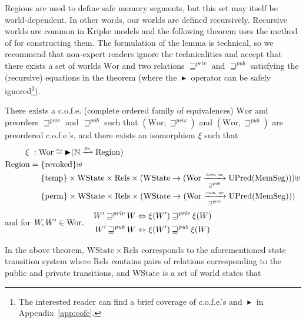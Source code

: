\documentclass[format=acmsmall, review=true, screen=true]{acmart}
\newcommand{\finparfun}{\xrightharpoonup{\textit{\tiny{fin}}}}
\newcommand{\fun}{\rightarrow}
\newcommand{\blater}{\mathop{\blacktriangleright}}
\newcommand{\cofe}{c.o.f.e.}
\newcommand{\cofes}{\cofe{}'s}
\newcommand\lau[1]{{\color{purple} \sf \footnotesize {LS: #1}}\\}
\newcommand\dominique[1]{{\color{purple} \sf \footnotesize {DD: #1}}\\}
\renewcommand\lau[1]{}
\renewcommand\dominique[1]{}
\newcommand{\var}[1]{\mathit{#1}}
\newcommand{\futurewk}{\mathbin{\sqsupseteq}^{\var{pub}}}
\newcommand{\futurestr}{\mathbin{\sqsupseteq}^{\var{priv}}}
\newcommand{\monwknefun}{\xrightarrow[\text{\tiny{$\futurewk$}}]{\textit{\tiny{mon, ne}}}}
\newcommand{\monstrnefun}{\xrightarrow[\text{\tiny{$\futurestr$}}]{\textit{\tiny{mon, ne}}}}
\newcommand{\plaindom}[1]{\mathrm{#1}}
\newcommand{\HeapSegments}{\plaindom{MemSeg}}
\newcommand{\nats}{\mathbb{N}}
\newcommand{\Rels}{\plaindom{Rels}}
\newcommand{\States}{\plaindom{WState}}
\newcommand{\Regions}{\plaindom{Region}}
\newcommand{\Wor}{\plaindom{Wor}}
\newcommand{\UPred}[1]{\plaindom{UPred}(#1)}
\newcommand{\plainview}[1]{\mathrm{#1}}
\newcommand{\perma}{\plainview{perm}}
\newcommand{\temp}{\plainview{temp}}
\newcommand{\revoked}{\plainview{revoked}}
\begin{document}
Regions are used to define safe memory segments, but this set may itself be world-dependent.
In other words, our worlds are defined recursively.
Recursive worlds are common in Kripke models and the following theorem uses the method of \citet{Birkedal:2011:SKM:1926385.1926401,Birkedal:tutorial-notes} for constructing them.
The formulation of the lemma is technical, so we recommend that non-expert readers ignore the technicalities and accept that there exists a set of worlds $\Wor$ and two relations $\futurestr$ and $\futurewk$ satisfying the (recursive) equations in the theorem (where the $\blater$ operator can be safely ignored\footnote{The interested reader can find a brief coverage of \cofe{}'s and $\blater$ in Appendix~\ref{app:cofe}.}).
\begin{theorem}\label{thm:world-existence}
  There exists a \cofe{} (complete ordered family of equivalences) $\Wor$ and preorders $\futurestr$ and
  $\futurewk$ such that $(\Wor,\futurestr)$ and $(\Wor,\futurewk)$ are
  preordered \cofes{}, and there exists an isomorphism $\xi$ such that
  \begin{align*}
      \xi \; : \; & \Wor \cong \blater (\nats \finparfun \Regions)\\
      \Regions  = & \; \{\revoked\} \uplus \\
               & \; \{\temp\} \times \States \times \Rels \times (\States \fun (\Wor \monwknefun \UPred{\HeapSegments}))\uplus \\
               & \; \{\perma\} \times \States \times \Rels \times (\States \fun (\Wor \monstrnefun \UPred{\HeapSegments}))
    \end{align*}
  and for $W, W' \in \Wor\ldotp \quad  
  \begin{aligned}
    W' \futurestr W & \Leftrightarrow \xi(W') \futurestr \xi(W)   \\
    W' \futurewk W & \Leftrightarrow \xi(W') \futurewk \xi(W)
  \end{aligned}$
\end{theorem}
In the above theorem, $\States \times \Rels$ corresponds to the aforementioned
state transition system where $\Rels$ contains pairs of relations corresponding
to the public and private transitions, and $\States$ is a set of world states that
\end{document}
